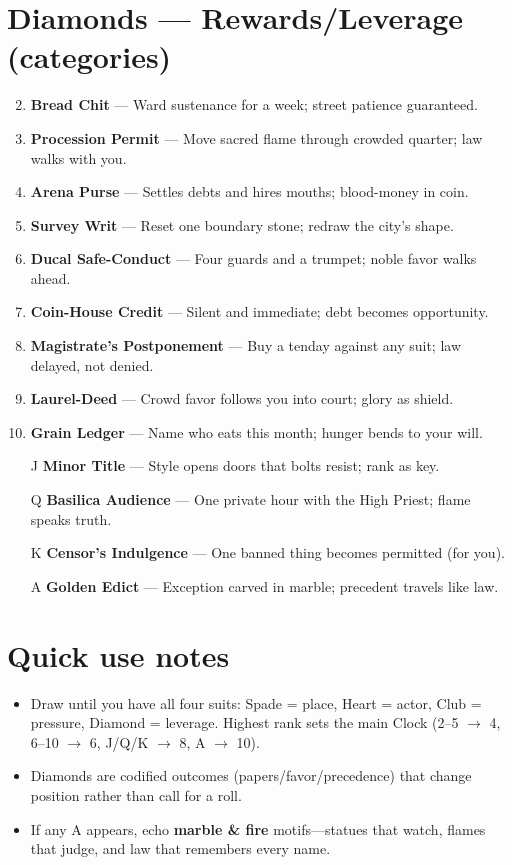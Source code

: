 \section*{Diamonds --- Rewards/Leverage (categories)}
\label{sec:ecktoria-rewards}
\begin{enumerate}
\setcounter{enumi}{1}
\item \textbf{Bread Chit} --- Ward sustenance for a week; street patience guaranteed.
\item \textbf{Procession Permit} --- Move sacred flame through crowded quarter; law walks with you.
\item \textbf{Arena Purse} --- Settles debts and hires mouths; blood-money in coin.
\item \textbf{Survey Writ} --- Reset one boundary stone; redraw the city's shape.
\item \textbf{Ducal Safe-Conduct} --- Four guards and a trumpet; noble favor walks ahead.
\item \textbf{Coin-House Credit} --- Silent and immediate; debt becomes opportunity.
\item \textbf{Magistrate's Postponement} --- Buy a tenday against any suit; law delayed, not denied.
\item \textbf{Laurel-Deed} --- Crowd favor follows you into court; glory as shield.
\item \textbf{Grain Ledger} --- Name who eats this month; hunger bends to your will.
\item[J] \textbf{Minor Title} --- Style opens doors that bolts resist; rank as key.
\item[Q] \textbf{Basilica Audience} --- One private hour with the High Priest; flame speaks truth.
\item[K] \textbf{Censor's Indulgence} --- One banned thing becomes permitted (for you).
\item[A] \textbf{Golden Edict} --- Exception carved in marble; precedent travels like law.
\end{enumerate}

\section*{Quick use notes}
\label{sec:ecktoria-quick-use}
\begin{itemize}
\item Draw until you have all four suits: Spade = place, Heart = actor, Club = pressure, Diamond = leverage. Highest rank sets the main Clock (2--5 $\rightarrow$ 4, 6--10 $\rightarrow$ 6, J/Q/K $\rightarrow$ 8, A $\rightarrow$ 10).
\item Diamonds are codified outcomes (papers/favor/precedence) that change position rather than call for a roll.
\item If any A appears, echo \textbf{marble \& fire} motifs---statues that watch, flames that judge, and law that remembers every name.
\end{itemize}


